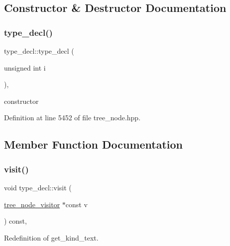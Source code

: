 \subsection{Constructor \& Destructor Documentation}
\mbox{\label{structtype__decl_a62c12b7f964c26ec71338bde59581b8a}} 
\subsubsection{\texorpdfstring{type\+\_\+decl()}{type\_decl()}}
{\footnotesize\ttfamily type\+\_\+decl\+::type\+\_\+decl (\begin{DoxyParamCaption}\item[{unsigned int}]{i }\end{DoxyParamCaption})\hspace{0.3cm}{\ttfamily [inline]}, {\ttfamily [explicit]}}



constructor 



Definition at line 5452 of file tree\+\_\+node.\+hpp.



\subsection{Member Function Documentation}
\mbox{\label{structtype__decl_a6c09e2072a083c2625e79de59006f7e6}} 
\subsubsection{\texorpdfstring{visit()}{visit()}}
{\footnotesize\ttfamily void type\+\_\+decl\+::visit (\begin{DoxyParamCaption}\item[{\hyperlink{classtree__node__visitor}{tree\+\_\+node\+\_\+visitor} $\ast$const}]{v }\end{DoxyParamCaption}) const\hspace{0.3cm}{\ttfamily [override]}, {\ttfamily [virtual]}}



Redefinition of get\+\_\+kind\+\_\+text. 


